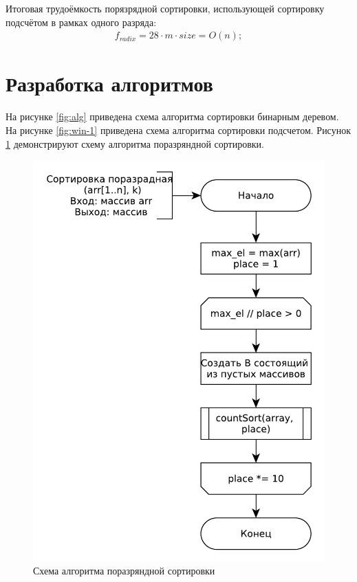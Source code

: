Итоговая трудоёмкость порязрядной сортировки, использующей сортировку подсчётом в рамках одного разряда: 
\begin{align}
	f_{radix} = 28 \cdot m \cdot size = O(n);
\end{align}

\section{Разработка алгоритмов}
На рисунке \ref{fig:alg} приведена схема алгоритма сортировки бинарным деревом. На рисунке \ref{fig:win-1} приведена схема алгоритма сортировки подсчетом. Рисунок  
\ref{fig:win-2} демонстрируют схему алгоритма поразряндной сортировки.

\begin{figure}[ht!]
	\centering
	\includegraphics[width=0.6\linewidth]{assets/range.pdf}
	\caption{Схема алгоритма поразряндной сортировки}
	\label{fig:win-2}
\end{figure}

